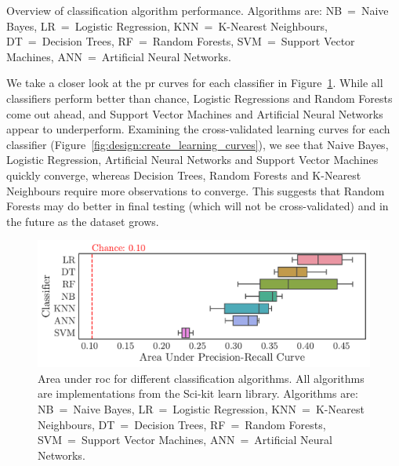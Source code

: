 \documentclass[../thesis/thesis.tex]{subfiles}
\begin{document}
\begin{table}[!htb]
    \centering
    \scalebox{0.8}{}
    \caption[Overview of classification algorithm performance]{Overview of classification algorithm performance. Algorithms are: NB~=~Naive Bayes, LR~=~Logistic Regression, KNN~=~K-Nearest Neighbours, DT~=~Decision Trees, RF~=~Random Forests, SVM~=~Support Vector Machines, ANN~=~Artificial Neural Networks.}
    \label{fig:design:classification_metrics}
\end{table}

We take a closer look at the \gls{pr} curves for each classifier in Figure~\ref{fig:design:classifier}. While all classifiers perform better than chance, Logistic Regressions and Random Forests come out ahead, and Support Vector Machines and Artificial Neural Networks appear to underperform. Examining the cross-validated learning curves for each classifier (Figure~\ref{fig:design:create_learning_curves}), we see that Naive Bayes, Logistic Regression, Artificial Neural Networks and Support Vector Machines quickly converge, whereas Decision Trees, Random Forests and K-Nearest Neighbours require more observations to converge. This suggests that Random Forests may do better in final testing (which will not be cross-validated) and in the future as the dataset grows.

\begin{figure}[!htb]
    \centering
    \includegraphics[width=\textwidth]{../figures/design/auc_classifier}
    \caption[Area under \gls{pr} Curves by classification algorithms]{Area under \gls{roc} for different classification algorithms. All algorithms are implementations from the Sci-kit learn library. Algorithms are: NB~=~Naive Bayes, LR~=~Logistic Regression, KNN~=~K-Nearest Neighbours, DT~=~Decision Trees, RF~=~Random Forests, SVM~=~Support Vector Machines, ANN~=~Artificial Neural Networks.}
    \label{fig:design:classifier}
\end{figure}
\end{document}
